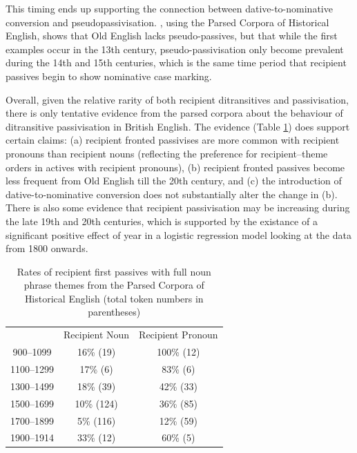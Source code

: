 	This timing ends up supporting the connection between dative-to-nominative conversion and pseudopassivisation. \cite{Sigursson.2014}, using the Parsed Corpora of Historical English, shows that Old English lacks pseudo-passives, but that while the first examples occur in the 13th century, pseudo-passivisation only become prevalent during the 14th and 15th centuries, which is the same time period that recipient passives begin to show nominative case marking.

	Overall, given the relative rarity of both recipient ditransitives and passivisation, there is only tentative evidence from the parsed corpora about the behaviour of ditransitive passivisation in British English. The evidence (Table \ref{tab:rec-pas-brit}) does support certain claims: (a) recipient fronted passivises are more common with recipient pronouns than recipient nouns (reflecting the preference for recipient--theme orders in actives with recipient pronouns), (b) recipient fronted passives become less frequent from Old English till the 20th century, and (c) the introduction of dative-to-nominative conversion does not substantially alter the change in (b). There is also some evidence that recipient passivisation may be increasing during the late 19th and 20th centuries, which is supported by the existance of a significant positive effect of year in a logistic regression model looking at the data from 1800 onwards.

	\begin{table}[ht!]
		\begin{tabular}{ccc}
				&	Recipient Noun	& Recipient Pronoun \\
		900--1099	&	16\% (19)	& 100\% (12) \\
		1100--1299	&	17\% (6)	& 83\% (6) \\
		1300--1499	&	18\% (39)	& 42\% (33) \\
		1500--1699	&	10\% (124)	& 36\% (85) \\
		1700--1899	&	5\% (116)	& 12\% (59) \\
		1900--1914	&	33\% (12)	& 60\% (5) \\
		\end{tabular}
		\caption{Rates of recipient first passives with full noun phrase themes from the Parsed Corpora of Historical English (total token numbers in parentheses)}
		\label{tab:rec-pas-brit}
	\end{table}

